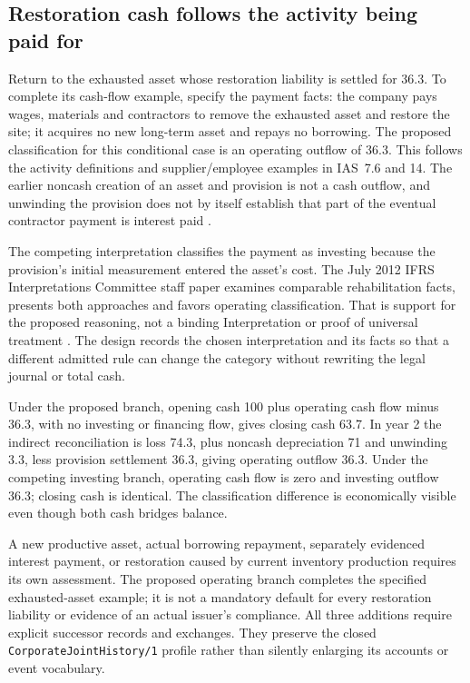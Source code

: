 \subsection{Restoration cash follows the activity being paid for}
\label{sec:restoration-cash-classification}

Return to the exhausted asset whose restoration liability is settled for
36.3. To complete its cash-flow example, specify the payment facts:
the company pays wages, materials and contractors to remove the exhausted
asset and restore the site; it acquires no new long-term asset and repays
no borrowing. The proposed classification for this conditional case is
an operating outflow of 36.3. This follows the activity definitions and
supplier/employee examples in IAS~7.6 and 14. The earlier noncash creation
of an asset and provision is not a cash outflow, and unwinding the provision
does not by itself establish that part of the eventual contractor payment
is interest paid \citep[IAS~7.6, 12--16, 31--33, 43--44;
IFRIC~1.8]{eu20231803}.

The competing interpretation classifies the payment as investing because
the provision's initial measurement entered the asset's cost. The
July 2012 IFRS Interpretations Committee staff paper examines comparable
rehabilitation facts, presents both approaches and favors operating
classification. That is support for the proposed reasoning, not a binding
Interpretation or proof of universal treatment
\citep[Appendix~A, A35--A43; status notice on p.~1]{ifric2012cashclassification}.
The design records the chosen interpretation and its facts so that a
different admitted rule can change the category without rewriting the
legal journal or total cash.

Under the proposed branch, opening cash 100 plus operating cash flow
minus 36.3, with no investing or financing flow, gives closing cash 63.7.
In year 2 the indirect reconciliation is loss 74.3, plus noncash
depreciation 71 and unwinding 3.3, less provision settlement 36.3, giving
operating outflow 36.3. Under the competing investing branch, operating
cash flow is zero and investing outflow 36.3; closing cash is identical.
The classification difference is economically visible even though both
cash bridges balance.

A new productive asset, actual borrowing repayment, separately evidenced
interest payment, or restoration caused by current inventory production
requires its own assessment. The proposed operating branch completes the
specified exhausted-asset example; it is not a mandatory default for every
restoration liability or evidence of an actual issuer's compliance.
All three additions require explicit successor records and exchanges.
They preserve the closed \texttt{CorporateJointHistory/1} profile rather
than silently enlarging its accounts or event vocabulary.
